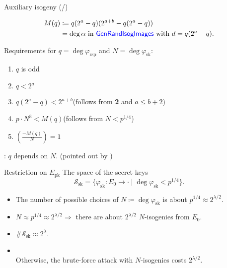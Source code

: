 \begin{frame}{Auxiliary isogeny (/\auxRIItotal{})}

    \vspace{-10pt}
    \begin{align*}
        M(q) &\coloneqq q(2^a - q)(2^{a + b} - q(2^a - q))\\
            &= \deg\alpha \text{ in \textcolor{blue}{\textsf{GenRandIsogImages}} with } d = q(2^a - q).
    \end{align*}

    \mypause
    \vspace{10pt}
    Requirements for $q = \deg\varphi_\mathrm{rsp}$ and $N = \deg\varphi_\mathrm{sk}$:
    \begin{enumerate}
        \item $q$ is odd
        \item $q < 2^a$
        \item $q(2^a - q) < 2^{a + b}$\quad (follows from \textbf{2} and $a \leq b + 2$)
        \item $p \cdot N^3 < M(q)$\qquad (follows from $N < p^{1/4}$)
        \item $\left(\frac{-M(q)}{N}\right) = 1$
    \end{enumerate}

    \vspace{10pt}
     : $q$ depends on $N$.\quad
    (pointed out by \cite{CCILV2024sqisign2d_attack})
\end{frame}

\begin{frame}{Restriction on $E_\mathrm{pk}$}
    The space of the secret keys
    $$
        \mathcal{S}_\mathrm{sk} = \{
            \varphi_\mathrm{sk}: E_0 \to \cdot
            \mid \deg\varphi_{\mathrm{sk}} < p^{1/4} \}.
    $$
    \begin{itemize}
        \setlength{\itemsep}{10pt}
        \item The number of possible choices of $N \coloneqq \deg\varphi_\mathrm{sk}$ is about $p^{1/4} \approx 2^{\lambda/2}$.
        \item $N \approx p^{1/4} \approx 2^{\lambda/2} \Rightarrow$ there are about $2^{\lambda/2}$ $N$-isogenies from $E_0$.
        \item $\#\mathcal{S}_\mathrm{sk} \approx 2^{\lambda}$.
        \item {}\\
            Otherwise, the brute-force attack with $N$-isogenies costs $2^{\lambda/2}$.
    \end{itemize}

\end{frame}

